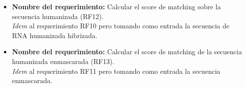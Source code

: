 \documentclass[12pt,a4paper,spanish]{article}
\begin{document}
\begin{itemize}
		\item \textbf{Nombre del requerimiento:} Calcular el score de matching sobre la secuencia humanizada (RF12).\\
		\textit{Idem} al requerimiento RF10 pero tomando como entrada la secuencia de RNA humanizada hibrizada. \\

		\item \textbf{Nombre del requerimiento:} Calcular el score de matching de la secuencia humanizada enmascarada 			(RF13).\\
		\textit{Idem} al requerimiento RF11 pero tomando como entrada la secuencia enmascarada. \\	




\end{itemize}
\end{document}
